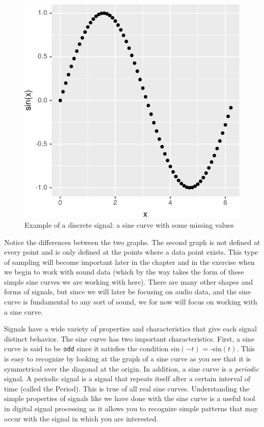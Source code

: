 \documentclass[]{krantz}
\begin{document}
\begin{figure}
\centering
\includegraphics{bookdown_files/figure-latex/digital-1.pdf}
\caption{\label{fig:digital}Example of a discrete signal: a sine curve with some missing values}
\end{figure}

Notice the differences between the two graphs. The second graph is not defined at every point and is only defined at the points where a data point exists. This type of sampling will become important later in the chapter and in the exercise when we begin to work with sound data (which by the way takes the form of these simple sine curves we are working with here). There are many other shapes and forms of signals, but since we will later be focusing on audio data, and the sine curve is fundamental to any sort of sound, we for now will focus on working with a sine curve.

Signals have a wide variety of properties and characteristics that give each signal distinct behavior. The sine curve has two important characteristics. First, a sine curve is said to be \texttt{odd} since it satisfies the condition sin\((-t)\) = -sin\((t)\). This is easy to recognize by looking at the graph of a sine curve as you see that it is symmetrical over the diagonal at the origin. In addition, a sine curve is a \emph{periodic} signal. A periodic signal is a signal that repeats itself after a certain interval of time (called the Period). This is true of all real sine curves. Understanding the simple properties of signals like we have done with the sine curve is a useful tool in digital signal processing as it allows you to recognize simple patterns that may occur with the signal in which you are interested.
\end{document}
